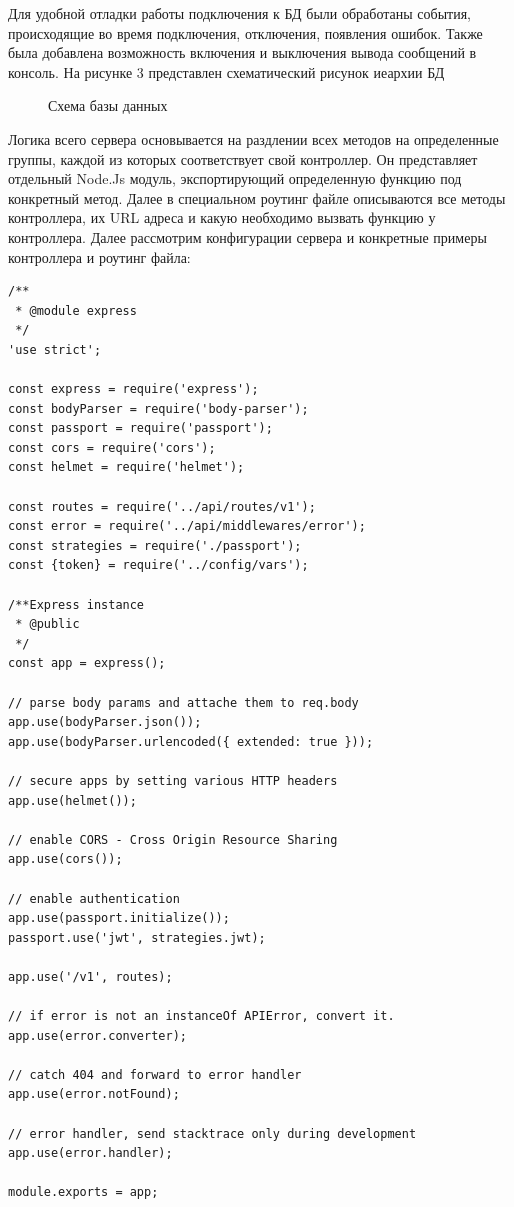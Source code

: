 \documentclass[12pt]{article}
\begin{document}
Для удобной отладки работы подключения к БД были обработаны события, происходящие во время подключения, отключения, появления ошибок. Также была добавлена возможность включения и выключения вывода сообщений в консоль. На рисунке 3 представлен схематический рисунок иеархии БД
\begin{figure}[h]
	\caption{Схема базы данных}
\end{figure}
\newpage

Логика всего сервера основывается на раздлении всех методов на определенные группы, каждой из которых соответствует свой контроллер. Он представляет отдельный Node.Js модуль, экспортирующий определенную функцию под конкретный метод. Далее в специальном роутинг файле описываются все методы контроллера, их URL адреса и какую необходимо вызвать функцию у контроллера. Далее рассмотрим конфигурации сервера и конкретные примеры контроллера и роутинг файла:
\footnotesize
\begin{verbatim}
/**
 * @module express
 */
'use strict';

const express = require('express');
const bodyParser = require('body-parser');
const passport = require('passport');
const cors = require('cors');
const helmet = require('helmet');

const routes = require('../api/routes/v1');
const error = require('../api/middlewares/error');
const strategies = require('./passport');
const {token} = require('../config/vars');

/**Express instance
 * @public
 */
const app = express();

// parse body params and attache them to req.body
app.use(bodyParser.json());
app.use(bodyParser.urlencoded({ extended: true }));

// secure apps by setting various HTTP headers
app.use(helmet());

// enable CORS - Cross Origin Resource Sharing
app.use(cors());

// enable authentication
app.use(passport.initialize());
passport.use('jwt', strategies.jwt);

app.use('/v1', routes);

// if error is not an instanceOf APIError, convert it.
app.use(error.converter);

// catch 404 and forward to error handler
app.use(error.notFound);

// error handler, send stacktrace only during development
app.use(error.handler);

module.exports = app;

\end{verbatim}
\normalsize
\end{document}
